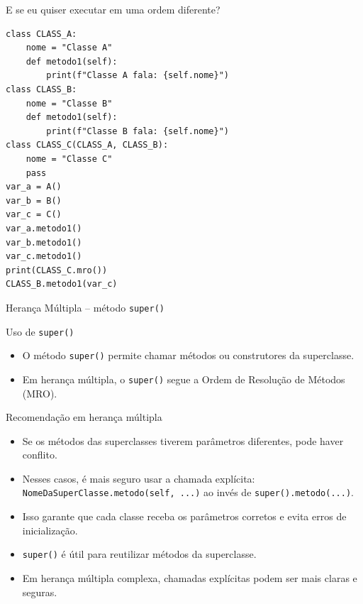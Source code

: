 \begin{frame}[fragile]{E se eu quiser executar em uma ordem diferente?}
    \footnotesize
    \begin{verbatim}
class CLASS_A:
    nome = "Classe A"
    def metodo1(self):
        print(f"Classe A fala: {self.nome}")  
class CLASS_B:
    nome = "Classe B"
    def metodo1(self):
        print(f"Classe B fala: {self.nome}")
class CLASS_C(CLASS_A, CLASS_B):
    nome = "Classe C"
    pass
var_a = A()
var_b = B()
var_c = C()
var_a.metodo1()
var_b.metodo1()
var_c.metodo1()
print(CLASS_C.mro())
CLASS_B.metodo1(var_c)  
    \end{verbatim}
\end{frame}

\begin{frame}{Herança Múltipla – método \texttt{super()}}

    \begin{block}{Uso de \texttt{super()}}
        \begin{itemize}
            \item O método \texttt{super()} permite chamar métodos ou construtores da superclasse.
            \item Em herança múltipla, o \texttt{super()} segue a Ordem de Resolução de Métodos (MRO).
        \end{itemize}
    \end{block}

    \begin{block}{Recomendação em herança múltipla}
        \begin{itemize}
            \item Se os métodos das superclasses tiverem parâmetros diferentes, pode haver conflito.
            \item Nesses casos, é mais seguro usar a chamada explícita:
                  \texttt{NomeDaSuperClasse.metodo(self, ...)}
                  ao invés de \texttt{super().metodo(...)}.
            \item Isso garante que cada classe receba os parâmetros corretos e evita erros de inicialização.

            \item \texttt{super()} é útil para reutilizar métodos da superclasse.
            \item Em herança múltipla complexa, chamadas explícitas podem ser mais claras e seguras.
        \end{itemize}
    \end{block}

\end{frame}


